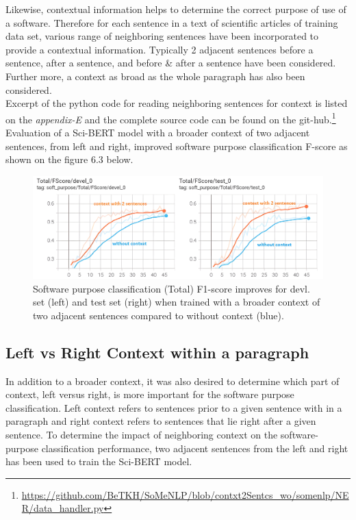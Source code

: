 Likewise, contextual information helps to determine the correct purpose of use of a software. Therefore for each sentence in a text of scientific articles of training data set, various range of neighboring sentences have been incorporated to provide a contextual information. Typically 2 adjacent sentences before a sentence, after a sentence, and before \& after a sentence have been considered. Further more, a context as broad as the whole paragraph has also been considered. \\

Excerpt of the python code for reading neighboring sentences for context is listed on the \emph{appendix-E} and the complete source code can be found on the git-hub.\footnote{\url{https://github.com/BeTKH/SoMeNLP/blob/contxt2Sentcs_wo/somenlp/NER/data_handler.py}}\\

Evaluation of a Sci-BERT model with a broader context of two adjacent sentences, from left and right, improved software purpose classification F-score as shown on the figure 6.3 below. 

\begin{figure}[htbp]
	\centering
	\includegraphics[width=.86\textwidth]{4.graphics/figures/ch_6/2.left_context_vs_right/HD/braoderContextFscore}
	\caption{Software purpose classification (Total) F1-score improves for devl. set (left) and test set (right) when trained with a broader context of two adjacent sentences compared to without context (blue).}
	\label{fig:chapter06:withvswithout}
\end{figure}

\subsection{Left vs Right Context within a paragraph}
\label{sec:chapter06:leftvsright}

In addition to a broader context, it was also desired to determine which part of context, left versus right, is more important for the software purpose classification. Left context refers to sentences prior to a given sentence with in  a paragraph and right context refers to sentences that lie right after a given sentence. To determine the impact of neighboring context on the software-purpose classification performance, two adjacent sentences from the left and right has been used to train the Sci-BERT model.  \\

